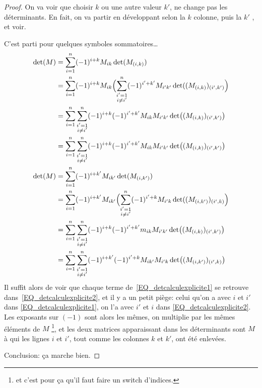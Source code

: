 \begin{proof}
  On va voir que choisir \( k \) ou une autre valeur \( k' \), ne change pas les déterminants. En fait, on va partir en développant selon la \( k \)\ieme{} colonne, puis la \( k' \) \ieme{}, et voir.
  
C'est parti pour quelques symboles sommatoires\dots
  \begin{subequations}
  \begin{align}
    \det(M) &= \sum_{i = 1}^n (-1)^{i+k} M_{ik} \det(M_{(i,k)})\\
    &= \sum_{i = 1}^n (-1)^{i+k} M_{ik} \Bigl(\sum_{\substack{i' = 1\\i \neq i'}}^n (-1)^{i'+k'} M_{i'k'} \det((M_{(i,k)})_{(i',k')}\Bigr)\\
    &= \sum_{i = 1}^n \sum_{\substack{i' = 1\\i \neq i'}}^n (-1)^{i+k} (-1)^{i'+k'}M_{ik}  M_{i'k'} \det\bigl((M_{(i,k)})_{(i',k')}\bigr)\\
    &= \sum_{i = 1}^n \sum_{\substack{i' = 1\\i \neq i'}}^n (-1)^{i+k} (-1)^{i'+k'}M_{ik}  M_{i'k'} \det\bigl((M_{(i,k)})_{(i',k')}\bigr)\label{EQ_detcalculexplicite1}\\
   \det(M) &= \sum_{i = 1}^n (-1)^{i+k'} M_{ik'} \det(M_{(i,k')})\\
    &= \sum_{i = 1}^n (-1)^{i+k'} M_{ik'} \Bigl(\sum_{\substack{i' = 1\\i \neq i'}}^n (-1)^{i'+k} M_{i'k} \det((M_{(i,k')})_{(i',k)}\Bigr)\\
    &= \sum_{i = 1}^n \sum_{\substack{i' = 1\\i \neq i'}}^n (-1)^{i+k} (-1)^{i'+k'}m_{ik}  M_{i'k'} \det\bigl((M_{(i,k)})_{(i',k')}\bigr)\\
    &= \sum_{i = 1}^n \sum_{\substack{i' = 1\\i \neq i'}}^n (-1)^{i+k'} (-1)^{i'+k}M_{ik'}  M_{i'k} \det\bigl((M_{(i,k')})_{(i',k)}\bigr)\label{EQ_detcalculexplicite2}
  \end{align}
  \end{subequations}
  Il suffit alors de voir que chaque terme de~\eqref{EQ_detcalculexplicite1} se retrouve dans~\eqref{EQ_detcalculexplicite2}, et il y a un petit piège: celui qu'on a avec \(i \) et \( i' \) dans \eqref{EQ_detcalculexplicite1}, on l'a avec \(i' \) et \( i \) dans \eqref{EQ_detcalculexplicite2}. Les exposants sur \( (-1) \) sont alors les mêmes, on multiplie par les mêmes éléments de \( M \) \footnote{et c'est pour ça qu'il faut faire un switch d'indices.}, et les deux matrices apparaissant dans les déterminants sont \( M \) à qui les lignes \( i \) et \(i' \), tout comme les colonnes \( k \) et \( k' \), ont été enlevées.
  
  Conclusion: ça marche bien.
\end{proof}

